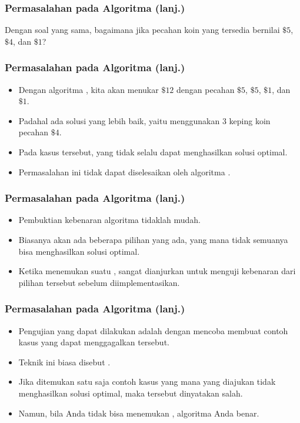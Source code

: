 \begin{frame}
  \frametitle{Permasalahan pada Algoritma \fGreedy (lanj.)}
  \begin{center}
    Dengan soal yang sama, bagaimana jika pecahan koin yang tersedia bernilai $\$5$, $\$4$, dan $\$1$?
  \end{center}
\end{frame}

\begin{frame}
  \frametitle{Permasalahan pada Algoritma \fGreedy (lanj.)}
  \begin{itemize}
    \item Dengan algoritma \fgreedy, kita akan menukar  $\$12$ dengan pecahan $\$5$, $\$5$, $\$1$, dan $\$1$.
    \item Padahal ada solusi yang lebih baik, yaitu menggunakan 3 keping koin pecahan $\$4$.
    \item Pada kasus tersebut, \fgreedyChoice yang tidak selalu dapat menghasilkan solusi optimal.
    \item Permasalahan ini tidak dapat diselesaikan oleh algoritma \fgreedy.
  \end{itemize}
\end{frame}

\begin{frame}
  \frametitle{Permasalahan pada Algoritma \fGreedy (lanj.)}
  \begin{itemize}
    \item Pembuktian kebenaran algoritma \fgreedy tidaklah mudah.
    \item Biasanya akan ada beberapa pilihan  \fgreedyChoice yang ada, yang mana tidak semuanya bisa menghasilkan solusi optimal.
    \item Ketika menemukan suatu \fgreedyChoice, sangat dianjurkan untuk menguji kebenaran dari pilihan tersebut sebelum diimplementasikan.
  \end{itemize}
\end{frame}

\begin{frame}
  \frametitle{Permasalahan pada Algoritma \fGreedy (lanj.)}
  \begin{itemize}
    \item Pengujian yang dapat dilakukan adalah dengan mencoba membuat contoh kasus yang dapat menggagalkan \fgreedyChoice tersebut.
    \item Teknik ini biasa disebut .
    \item Jika ditemukan satu saja contoh kasus yang mana \fgreedyChoice yang diajukan tidak menghasilkan solusi optimal, maka \fgreedyChoice tersebut dinyatakan salah.
    \item Namun, bila Anda tidak bisa menemukan ,  algoritma Anda benar.
  \end{itemize}
\end{frame}

